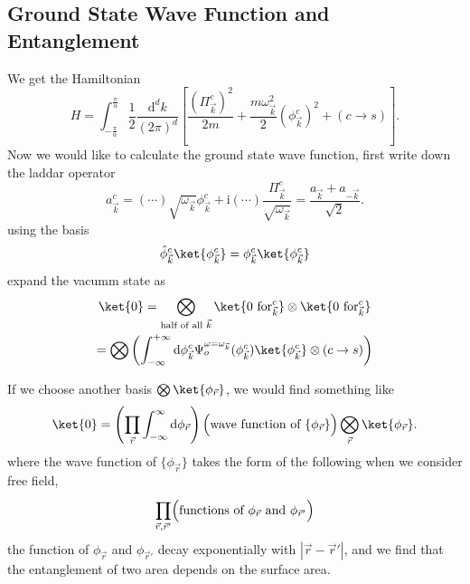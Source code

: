 
\subsection{Ground State Wave Function and Entanglement}

We get the Hamiltonian 
\begin{equation}
  H = \int_{-\frac{\pi}{\alpha}}^{\frac{\pi}{\alpha}} \frac{1}{2} \frac{\mathrm{d} ^{d} k}{\left( 2\pi \right) ^{d}} \left[ \frac{\left( \Pi_{\vec{k}}^{c} \right) ^{2}}{2m} + \frac{m\omega_{\vec{k}}^{2}}{2} \left( \phi_{\vec{k}}^{c} \right) ^{2} + (c \to  s   ) \right] .
\end{equation}
Now we would like to calculate the ground state wave function, first write down the laddar operator
\begin{equation}
    a_{\vec{k}}^{c} = (\cdots) \sqrt{\omega_{\vec{k}}} \phi_{\vec{k}}^{c} + \mathrm{i} (\cdots) \frac{\Pi_{\vec{k}}^{c}}{\sqrt{\omega_{\vec{k}}}} = \frac{a_{\vec{k}}+ a_{-\vec{k}}}{\sqrt{2}}.
\end{equation}
using the basis
\begin{equation}
    \hat{\phi}_{\vec{k}}^{c} \ket{\phi_{\vec{k}}^{c}} = \phi_{\vec{k}}^{c} \ket{\phi_{\vec{k}}^{c}}
\end{equation}
expand the vacumm state as
\begin{equation}
    \begin{gathered}
        \ket{0} = \bigotimes_{\text{half of all $\vec{k}$}} \ket{0 \text{ for}_{\vec{k}}^{c}} \otimes \ket{0 \text{ for}_{\vec{k}}^{c}} 
        \\
        = \bigotimes \left( \int_{-\infty}^{+\infty} \mathrm{d}\phi_{\vec{k}} ^{c} \Psi_{o} ^{\omega = \omega_{\vec{k}}} (\phi_{\vec{k}}^{c}) \ket{\phi_{\vec{k}}^{c} } \otimes (c\to s) \right) 
    \end{gathered}
\end{equation}

If we choose another basis $\bigotimes \ket{\phi_{\vec{r}}}$,
we would find something like
\begin{equation}
  \ket{0} = \left( \prod_{\vec{r}}^{} \int_{-\infty}^{\infty} \mathrm{d}\phi_{\vec{r}} \right) \Bigl( \text{wave function of } \{ \phi_{\vec{r}} \} \Bigr) \bigotimes _{\vec{r}} \ket{\phi_{\vec{r}}}.
\end{equation}
where the wave function of $\{ \phi_{\vec{r}} \}$ takes the form of the following when we consider free field,
\begin{equation}
  \prod_{\vec{r}, \vec{r}'}^{} \Bigl(\text{functions of } \phi_{\vec{r}} \text{ and } \phi_{\vec{r}'}\Bigr)
\end{equation}
the function of $\phi_{\vec{r}}$ and $\phi_{\vec{r}'}$ decay exponentially with $|\vec{r}-\vec{r}'|$, and we find that the entanglement of two area depends on the surface area.


